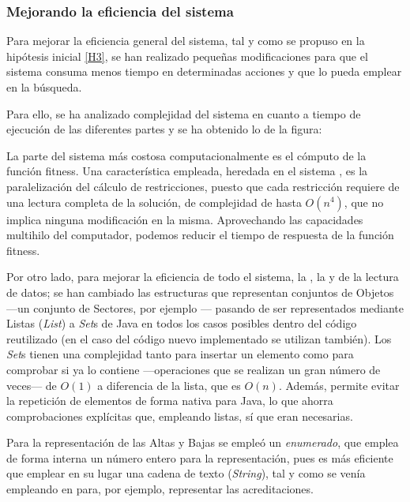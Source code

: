 \subsubsection{Mejorando la eficiencia del sistema}
\label{sec:4:mejorando-eficiencia}

Para mejorar la eficiencia general del sistema, tal y como se propuso en la hipótesis inicial \ref{H3}, se han realizado pequeñas modificaciones para que el sistema consuma menos tiempo en determinadas acciones y que lo pueda emplear en la búsqueda.

Para ello, se ha analizado complejidad del sistema en cuanto a tiempo de ejecución de las diferentes partes y se ha obtenido lo de la figura:  %

La parte del sistema más costosa computacionalmente es el cómputo de la función fitness. Una característica empleada, heredada en el sistema \legacy{}, es la paralelización del cálculo de restricciones, puesto que cada restricción requiere de una lectura completa de la solución, de complejidad de hasta $O(n^4)$, que no implica ninguna modificación en la misma. Aprovechando las capacidades multihilo del computador, podemos reducir el tiempo de respuesta de la función fitness. %

Por otro lado, para mejorar la eficiencia de todo el sistema, la \faseuno{}, la \fasedos{} y de la lectura de datos; se han cambiado las estructuras que representan conjuntos de Objetos ---un conjunto de Sectores, por ejemplo --- pasando de ser representados mediante Listas (\textit{List}) a \textit{Set}s de Java en todos los casos posibles dentro del código \legacy{} reutilizado (en el caso del código nuevo implementado se utilizan también). Los \textit{Set}s tienen una complejidad tanto para insertar un elemento como para comprobar si ya lo contiene ---operaciones que se realizan un gran número de veces--- de $O(1)$ a diferencia de la lista, que es $O(n)$. Además, permite evitar la repetición de elementos de forma nativa para Java, lo que ahorra comprobaciones explícitas que, empleando listas, sí que eran necesarias.

Para la representación de las Altas y Bajas se empleó un \textit{enumerado}, que emplea de forma interna un número entero para la representación, pues es más eficiente que emplear en su lugar una cadena de texto (\textit{String}), tal y como se venía empleando en \legacy{} para, por ejemplo, representar las acreditaciones.

